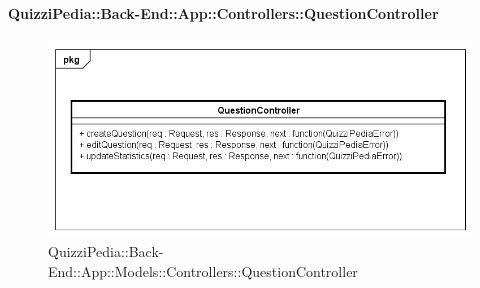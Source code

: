 \paragraph{QuizziPedia::Back-End::App::Controllers::QuestionController}
\label{QuizziPedia::Back-End::App::Controllers::QuestionController}
\begin{figure}
	\centering
	\includegraphics[scale=0.45]{UML/Classi/Back-End/QuizziPedia_Back-End_App_Controllers_questionController.png}
	\caption{QuizziPedia::Back-End::App::Models::Controllers::QuestionController}
\end{figure}
